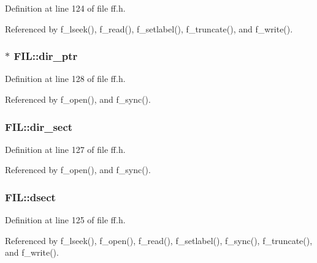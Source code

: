 Definition at line 124 of file ff.\+h.



Referenced by f\+\_\+lseek(), f\+\_\+read(), f\+\_\+setlabel(), f\+\_\+truncate(), and f\+\_\+write().

\subsubsection[{\texorpdfstring{dir\+\_\+ptr}{dir_ptr}}]{$\ast$ F\+I\+L\+::dir\+\_\+ptr}\hypertarget{structFIL_a5af9e9fb312b629220eaf684dd28c4a9}{}\label{structFIL_a5af9e9fb312b629220eaf684dd28c4a9}


Definition at line 128 of file ff.\+h.



Referenced by f\+\_\+open(), and f\+\_\+sync().

\subsubsection[{\texorpdfstring{dir\+\_\+sect}{dir_sect}}]{ F\+I\+L\+::dir\+\_\+sect}\hypertarget{structFIL_ab203794f939ad4480e81dfa488770783}{}\label{structFIL_ab203794f939ad4480e81dfa488770783}


Definition at line 127 of file ff.\+h.



Referenced by f\+\_\+open(), and f\+\_\+sync().

\subsubsection[{\texorpdfstring{dsect}{dsect}}]{ F\+I\+L\+::dsect}\hypertarget{structFIL_ab3d4165d6fd32ac71a130d835fbf0b4d}{}\label{structFIL_ab3d4165d6fd32ac71a130d835fbf0b4d}


Definition at line 125 of file ff.\+h.



Referenced by f\+\_\+lseek(), f\+\_\+open(), f\+\_\+read(), f\+\_\+setlabel(), f\+\_\+sync(), f\+\_\+truncate(), and f\+\_\+write().

